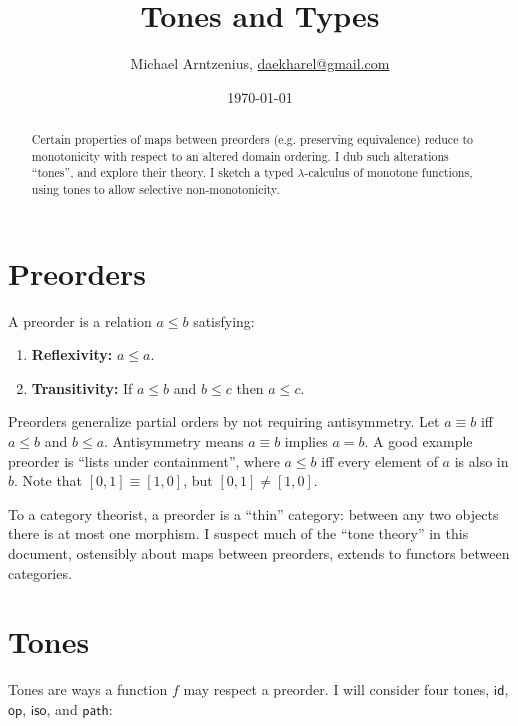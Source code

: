\documentclass{rntz}
\title{Tones and Types}
\author{Michael Arntzenius, %
  \href{mailto:daekharel@gmail.com}{daekharel@gmail.com}}
\date{\today}
\newcommand{\ms}[1]{\ensuremath{\mathsf{#1}}}
\newcommand{\id}{\ms{id}}
\newcommand{\op}{\ms{op}}
\newcommand{\iso}{\ms{iso}}     %
\renewcommand{\path}{\ms{path}} %
\newcommand{\tm}{\id}                        %
\newcommand{\ta}{{\color{ForestGreen}\op}}   %
\newcommand{\ti}{{\color{NavyBlue}\iso}}     %
\newcommand{\tb}{{\color{Bittersweet}\path}} %
\begin{document}
\maketitle

\begin{abstract}
 Certain properties of maps between preorders (e.g.\! preserving equivalence)
 reduce to monotonicity with respect to an altered domain ordering. I dub such
 alterations ``tones'', and explore their theory. I sketch a typed
 $\lambda$-calculus of monotone functions, using tones to allow selective
 non-mono\-tonicity.
\end{abstract}

\section{Preorders}

A preorder is a relation $a \le b$ satisfying:
\begin{enumerate}
\item \textbf{Reflexivity:} $a \le a$.
\item \textbf{Transitivity:} If $a \le b$ and $b \le c$ then $a \le c$.
\end{enumerate}

Preorders generalize partial orders by not requiring antisymmetry. Let $a \equiv
b$ iff $a \le b$ and $b \le a$. Antisymmetry means $a \equiv b$ implies $a = b$.
%
A good example preorder is ``lists under containment'', where $a \le b$ iff
every element of $a$ is also in $b$. Note that $[0,1] \equiv [1,0]$, but $[0,1]
\ne [1,0]$.

To a category theorist, a preorder is a ``thin'' category: between any two
objects there is at most one morphism. I suspect much of the ``tone theory'' in
this document, ostensibly about maps between preorders, extends to functors
between categories.


\section{Tones}\label{sec:tones}

Tones are ways a function $f$ may respect a preorder. I will consider four
tones, \tm, \ta, \ti, and \tb:
\end{document}
